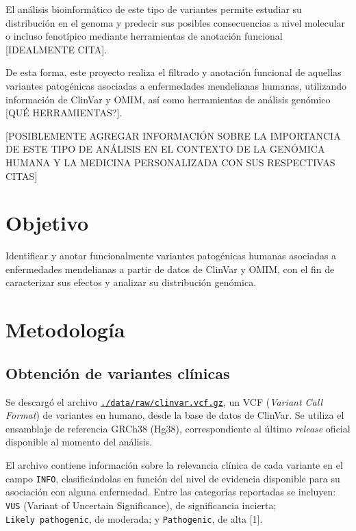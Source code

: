 \documentclass[
  spanish,
  11pt,
]{article}
\begin{document}
El análisis bioinformático de este tipo de variantes permite estudiar su
distribución en el genoma y predecir sus posibles consecuencias a nivel
molecular o incluso fenotípico mediante herramientas de anotación
funcional {[}IDEALMENTE CITA{]}.

De esta forma, este proyecto realiza el filtrado y anotación funcional
de aquellas variantes patogénicas asociadas a enfermedades mendelianas
humanas, utilizando información de ClinVar y OMIM, así como herramientas
de análisis genómico {[}QUÉ HERRAMIENTAS?{]}.

{[}POSIBLEMENTE AGREGAR INFORMACIÓN SOBRE LA IMPORTANCIA DE ESTE TIPO DE
ANÁLISIS EN EL CONTEXTO DE LA GENÓMICA HUMANA Y LA MEDICINA
PERSONALIZADA CON SUS RESPECTIVAS CITAS{]}

\section{Objetivo}\label{objetivo}

Identificar y anotar funcionalmente variantes patogénicas humanas
asociadas a enfermedades mendelianas a partir de datos de ClinVar y
OMIM, con el fin de caracterizar sus efectos y analizar su distribución
genómica.

\section{Metodología}\label{metodologuxeda}

\subsection{Obtención de variantes
clínicas}\label{obtenciuxf3n-de-variantes-cluxednicas}

Se descargó el archivo
\href{https://www.ncbi.nlm.nih.gov/clinvar/docs/downloads/}{\texttt{./data/raw/clinvar.vcf.gz}},
un VCF (\emph{Variant Call Format}) de variantes en humano, desde la
base de datos de ClinVar. Se utiliza el ensamblaje de referencia GRCh38
(Hg38), correspondiente al último \emph{release} oficial disponible al
momento del análisis.

El archivo contiene información sobre la relevancia clínica de cada
variante en el campo \texttt{INFO}, clasificándolas en función del nivel
de evidencia disponible para su asociación con alguna enfermedad. Entre
las categorías reportadas se incluyen: \texttt{VUS} (Variant of
Uncertain Significance), de significancia incierta;
\texttt{Likely\ pathogenic}, de moderada; y \texttt{Pathogenic}, de alta
{[}1{]}.
\end{document}
